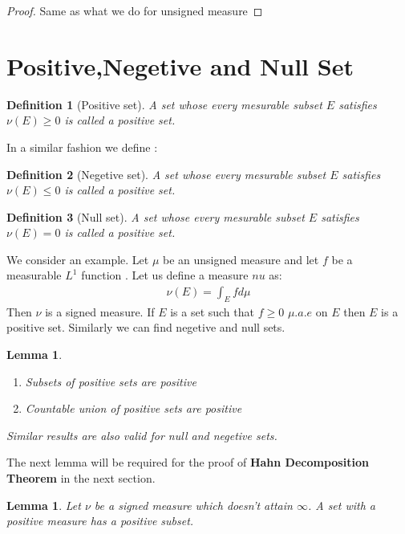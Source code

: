 \documentclass[notoc]{tufte-book}
\newtheorem{defn}{Definition}
\newtheorem{lemma}[theorem]{Lemma}
\begin{document}
\begin{proof}
Same as what we do for unsigned measure
\end{proof}

\section{Positive,Negetive and Null Set}

\begin{defn}[Positive set]
	A set whose every mesurable subset $E$ satisfies $\nu(E)\geq0$ is called a positive set.
\end{defn}
\noindent In a similar fashion we define :

\begin{defn}[Negetive set]
	A set whose every mesurable subset $E$ satisfies $\nu(E)\leq0$ is called a positive set.
\end{defn}

\begin{defn}[Null set]
	A set whose every mesurable subset $E$ satisfies $\nu(E)=0$ is called a positive set.
\end{defn}

\noindent We consider an example. Let $\mu$ be an unsigned measure and let $f$ be a measurable $L^1$ function . Let us define a measure $nu$ as:
\begin{align}
	\nu(E)=\int_Efd\mu
\end{align}
Then $\nu$ is a signed measure. If $E$ is a set such that $f\geq0$ $\mu.a.e$ on $E$ then $E$ is a positive set. Similarly we can find negetive and null sets.

\begin{lemma}
	\begin{enumerate}
		\item Subsets of positive sets are positive
		\item Countable union of positive sets are positive
	\end{enumerate}
	Similar results are also valid for null and negetive sets.
\end{lemma}

\noindent The next lemma will be required for the proof of \textbf{Hahn Decomposition Theorem} in the next section.


\begin{lemma}
	Let $\nu$ be a signed measure which doesn't attain $\infty$. A set with a positive measure has a positive subset.
\end{lemma}
\end{document}
